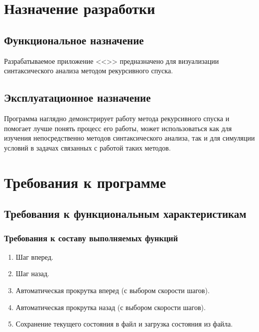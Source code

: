 \documentclass[a4paper,12pt,reqno]{article}
\begin{document}
  \newpage
  \section{Назначение разработки}
  \subsection{Функциональное назначение}
  Разрабатываемое приложение <<\CRTname>> предназначено для визуализации синтаксического анализа методом рекурсивного спуска.
  \subsection{Эксплуатационное назначение}
  Программа наглядно демонстрирует работу метода рекурсивного спуска и помогает лучше понять процесс его работы, может использоваться как для изучения непосредственно методов синтаксического анализа, так и для симуляции условий в задачах связанных с работой таких методов.

  \newpage
  \section{Требования к программе}
  \subsection{Требования к функциональным характеристикам}
  \subsubsection{Требования к составу выполняемых функций}
  \label{sec:funcs}
  \begin{enumerate}
    \item Шаг вперед.
    \item Шаг назад.
    \item Автоматическая прокрутка вперед (с выбором скорости шагов).
    \item Автоматическая прокрутка назад (с выбором скорости шагов).
    \item Сохранение текущего состояния в файл и загрузка состояния из файла.
  \end{enumerate}
\end{document}
